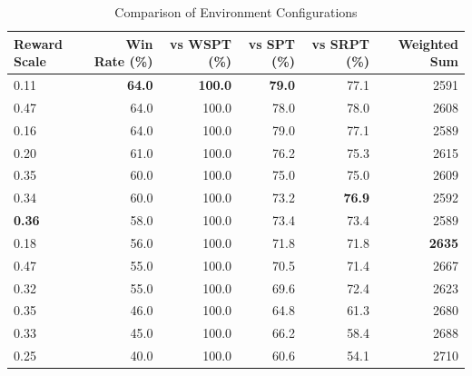 \begin{table}[htbp]%
\centering%
\begin{tabular}{lrrrrr}%
\toprule%
\textbf{Reward Scale}&\textbf{Win Rate (\%)}&\textbf{vs WSPT (\%)}&\textbf{vs SPT (\%)}&\textbf{vs SRPT (\%)}&\textbf{Weighted Sum}\\%
\midrule%
0.11&\textbf{64.0}&\textbf{100.0}&\textbf{79.0}&77.1&2591\\%
0.47&64.0&100.0&78.0&78.0&2608\\%
0.16&64.0&100.0&79.0&77.1&2589\\%
0.20&61.0&100.0&76.2&75.3&2615\\%
0.35&60.0&100.0&75.0&75.0&2609\\%
0.34&60.0&100.0&73.2&\textbf{76.9}&2592\\%
\textbf{0.36}&58.0&100.0&73.4&73.4&2589\\%
0.18&56.0&100.0&71.8&71.8&\textbf{2635}\\%
0.47&55.0&100.0&70.5&71.4&2667\\%
0.32&55.0&100.0&69.6&72.4&2623\\%
0.35&46.0&100.0&64.8&61.3&2680\\%
0.33&45.0&100.0&66.2&58.4&2688\\%
0.25&40.0&100.0&60.6&54.1&2710\\%
\bottomrule%
\end{tabular}%
\caption{Comparison of Environment Configurations}%
\label{tab:environment}%
\end{table}